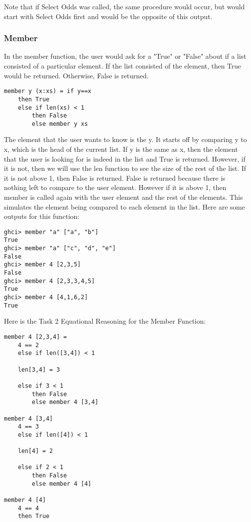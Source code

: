 \documentclass{article}
\theoremstyle{theorem}
\theoremstyle{definition}
\theoremstyle{remark}
\begin{document}
\noindent\newline Note that if Select Odds was called, the same procedure would occur, but would start with Select Odds first and would be the opposite of this output.
\subsubsection{Member}
In the member function, the user would ask for a "True" or "False" about if a list consisted of a particular element. If the list consisted of the element, then True would be returned. Otherwise, False is returned.

\begin{verbatim}
member y (x:xs) = if y==x
    then True
    else if len(xs) < 1
        then False
        else member y xs
\end{verbatim}
The element that the user wants to know is the y. It starts off by comparing y to x, which is the head of the current list. If y is the same as x, then the element that the user is looking for is indeed in the list and True is returned. However, if it is not, then we will use the len function to see the size of the rest of the list. If it is not above 1, then False is returned. False is returned because there is nothing left to compare to the user element. However if it is above 1, then member is called again with the user element and the rest of the elements. This simulates the element being compared to each element in the list. \newline
\newline Here are some outputs for this function:
\begin{verbatim}
ghci> member "a" ["a", "b"]
True
ghci> member "a" ["c", "d", "e"]
False
ghci> member 4 [2,3,5]
False
ghci> member 4 [2,3,3,4,5]
True
ghci> member 4 [4,1,6,2]
True
\end{verbatim}
\noindent\newline\newline Here is the Task 2 Equational Reasoning for the Member Function:
\begin{verbatim}
member 4 [2,3,4] =
    4 == 2
    else if len([3,4]) < 1

    len[3,4] = 3

    else if 3 < 1
        then False
        else member 4 [3,4]
    
member 4 [3,4]  
    4 == 3
    else if len([4]) < 1

    len[4] = 2

    else if 2 < 1
        then False
        else member 4 [4]
    
member 4 [4]
    4 == 4
    then True
\end{verbatim}
\end{document}

